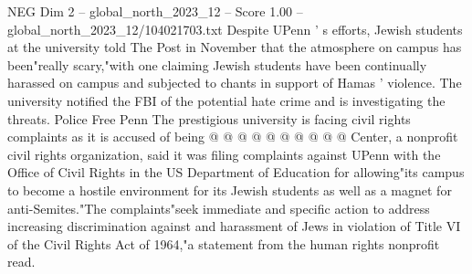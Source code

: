 \begin{textsample}{NEG Dim 2 – global\_north\_2023\_12 – Score 1.00 – global\_north\_2023\_12/104021703.txt}
Despite UPenn ' s efforts, Jewish students at the university told The Post in November that the atmosphere on campus has been"really scary,"with one claiming Jewish students have been continually harassed on campus and subjected to chants in support of Hamas ' violence.
The university notified the FBI of the potential hate crime and is investigating the threats.
Police Free Penn The prestigious university is facing civil rights complaints as it is accused of being @ @ @ @ @ @ @ @ @ @ Center, a nonprofit civil rights organization, said it was filing complaints against UPenn with the Office of Civil Rights in the US Department of Education for allowing"its campus to become a hostile environment for its Jewish students as well as a magnet for anti-Semites."The complaints"seek immediate and specific action to address increasing discrimination against and harassment of Jews in violation of Title VI of the Civil Rights Act of 1964,"a statement from the human rights nonprofit read.

\end{textsample}

